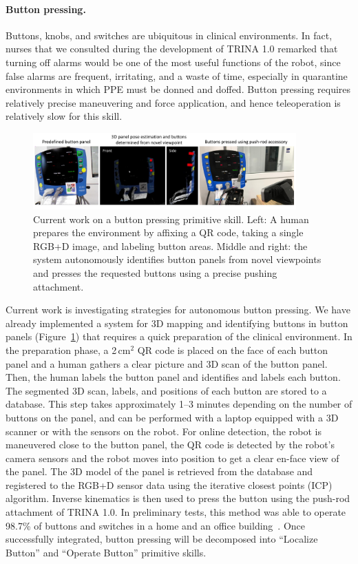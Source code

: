 \paragraph{Button pressing.} Buttons, knobs, and switches are ubiquitous in clinical environments.  In fact, nurses that we consulted during the development of TRINA 1.0 remarked that turning off alarms would be one of the most useful functions of the robot, since false alarms are frequent, irritating, and a waste of time, especially in quarantine environments in which PPE must be donned and doffed. Button pressing requires relatively precise maneuvering and force application, and hence teleoperation is relatively slow for this skill.

\begin{figure}
\centering
\includegraphics[width=0.9\textwidth]{fig/ButtonPressing.pdf}
\caption{Current work on a button pressing primitive skill. Left: A human prepares the environment by affixing a QR code, taking a single RGB+D image, and labeling button areas.  Middle and right: the system autonomously identifies button panels from novel viewpoints and presses the requested buttons using a precise pushing attachment.}
\label{fig:ButtonPressing}
\end{figure}

Current work is investigating strategies for autonomous button pressing.  We have already implemented a system for 3D mapping and identifying buttons in button panels (Figure~\ref{fig:ButtonPressing}) that requires a quick preparation of the clinical environment.  In the preparation phase, a 2\,cm$^2$ QR code is placed on the face of each button panel and a human gathers a clear picture and 3D scan of the button panel.  Then, the human labels the button panel and identifies and labels each button.  The segmented 3D scan, labels, and positions of each button are stored to a database.  This step takes approximately 1--3 minutes depending on the number of buttons on the panel, and can be performed with a laptop equipped with a 3D scanner or with the sensors on the robot.
%
For online detection, the robot is maneuvered close to the button panel, the QR code is detected by the robot's camera sensors and the robot moves into position to get a clear en-face view of the panel.  The 3D model of the panel is retrieved  from the database and registered to the RGB+D sensor data using the iterative closest points (ICP) algorithm.  Inverse kinematics is then used to press the button using the push-rod attachment of TRINA 1.0.  In preliminary tests, this method was able to operate 98.7\% of buttons and switches in a home and an office building~\cite{WangHauser2018}.
Once successfully integrated, button pressing will be decomposed into ``Localize Button'' and ``Operate Button'' primitive skills.

